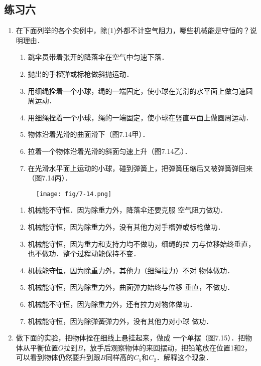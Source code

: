 \subsection{练习六}
\begin{enumerate}
    \item 在下面列举的各个实例中，除(1)外都不计空气阻力，哪些机械能是守恒的？说明理由．
    \begin{enumerate}[(1)]
        \item 跳伞员带着张开的降落伞在空气中匀速下落．
        \item 抛出的手榴弹或标枪做斜抛运动．
        \item 用细绳拴着一个小球，绳的一端固定，使小球在光滑的水平面上做匀速圆周运动．
        \item 用细绳拴着一个小球，绳的一端固定，使小球在竖直平面上做圆周运动．
        \item 物体沿着光滑的曲面滑下（图7.14甲）．
        \item 拉着一个物体沿着光滑的斜面匀速上升（图7.14乙）．
        \item 在光滑水平面上运动的小球，碰到弹簧上，把弹簧压缩后又被弹簧弹回来（图7.14丙）．
    \end{enumerate}
\begin{figure}[htp]
\centering\texttt{[image: fig/7-14.png]}
\caption{}
\end{figure}

\begin{solution}
\begin{enumerate}
    \item 机械能不守恒．因为除重力外，降落伞还要克服
    空气阻力做功．
    \item 机械能守恒，因为除重力外，没有其他力对手榴弹或标枪做功．
    \item 机械能守恒，因为重力和支持力均不做功，细绳的拉
    力与位移始终垂直，也不做功．整个过程动能保持不变．
    \item 机械能守恒，因为除重力外，其他力（细绳拉力）不对
    物体做功．
    \item 机械能守恒，因为除重力外，曲面弹力始终与位移
    垂直，不做功．
    \item 机械能不守恒，因为除重力外，还有拉力对物体做功．
    \item 机械能守恒，因为除弹簧弹力外，没有其他力对小球
    做功．
\end{enumerate}
\end{solution}
    \item  做下面的实验，把物体拴在细线上悬挂起来，做成
    一个单摆（图7.15）．把物体从平衡位置$O$拉到$B$，放手后观察物体的来回摆动，把铅笔放在位置1和2，可以看到物体仍然要升到跟$B$同样高的$C_1$和$C_2$．解释这个现象．
\begin{figure}[htp]
\centering
{}
\end{figure}
\end{enumerate}

